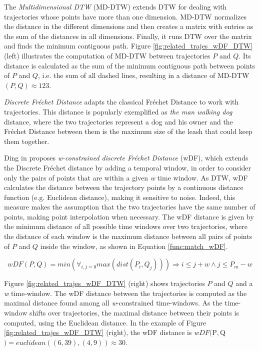 The \emph{Multidimensional DTW} (MD-DTW) \cite{ten2007multi} extends DTW for dealing with trajectories whose points have more than one dimension. MD-DTW normalizes the distance in the different dimensions and then creates a matrix with entries as the sum of the distances in all dimensions. Finally, it runs DTW over the matrix and finds the minimum contiguous path. Figure \ref{fig:related_trajes_wDF_DTW} (left) illustrates the computation of MD-DTW between trajectories $P$ and $Q$. Its distance is calculated as the sum of the minimum contiguous path between points of $P$ and $Q$, i.e. the sum of all dashed lines, resulting in a distance of MD-DTW$(P, Q) \approx 123$.

{\emph{Discrete Fr{\'e}chet Distance} }\cite{eiter1994computing}{adapts the classical Fr{\'e}chet Distance }\cite{Frechet1906}{ to work with trajectories. This distance is popularly exemplified as \textit{the man walking dog} distance, where the two trajectories represent a dog and his owner and the Fr{\'e}chet Distance between them is the maximum size of the leash that could keep them together.}

Ding in \cite{Ding:2008:ESJ:1440463.1440989} proposes \emph{w-constrained discrete Fr{\'e}chet Distance} (wDF), which extends the Discrete Fr{\'e}chet distance \cite{eiter1994computing} by adding a temporal window, in order to consider only the pairs of points that are within a given \emph{w} time window. {As DTW, wDF calculates the distance between the trajectory points by a continuous distance function (e.g. Euclidean distance), making it sensitive to noise}. Indeed, this measure makes the assumption that the two trajectories have the same number of points, making point interpolation when necessary. The wDF distance is given by the minimum distance of all possible time windows over two trajectories, where the distance of each window is the maximum distance between all pairs of points of $P$ and $Q$ inside the window, as shown in Equation \ref{func:match_wDF}.

\begin{equation}
\label{func:match_wDF}
  wDF(P, Q) = min(\forall_{i,j=0}max(dist(P_i, Q_j))) \Rightarrow i \leq j + w \land
  j \leq P_{m} - w
\end{equation}

Figure \ref{fig:related_trajes_wDF_DTW} (right) shows trajectories $P$ and $Q$ and a \emph{w} time-window. The wDF distance between the trajectories is computed as the maximal distance found among all \emph{w}-constrained time-windows. As the time-window shifts over trajectories, the maximal distance between their points is computed, using the Euclidean distance. In the example of Figure \ref{fig:related_trajes_wDF_DTW} (right), the wDF distance is $wDF($P$, $Q$) = euclidean((6,39), (4,9)) \approx 30$.

